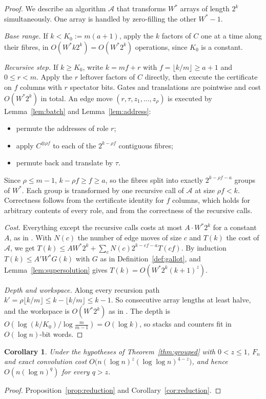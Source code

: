 \documentclass[11pt]{article}
\newtheorem{corollary}[theorem]{Corollary}
\theoremstyle{definition}
\theoremstyle{remark}
\begin{document}
\begin{proof}
We describe an algorithm $\mathcal A$ that transforms $W^*$ arrays of length $2^k$ simultaneously. One
array is handled by zero-filling the other $W^*-1$.

\emph{Base range.} If $k<K_0:=m(a+1)$, apply the $k$ factors of $C$ one at a time along their fibres,
in $O(W^*k2^k)=O(W^*2^k)$ operations, since $K_0$ is a constant.

\emph{Recursive step.} If $k\ge K_0$, write $k=mf+r$ with $f=\lfloor k/m\rfloor\ge a+1$ and
$0\le r<m$. Apply the $r$ leftover factors of $C$ directly, then execute the certificate on $f$ columns
with $r$ spectator bits. Gates and translations are pointwise and cost $O(W^*2^k)$ in total. An edge
move $(r,\tau,z_1,\dots,z_\rho)$ is executed by Lemma~\ref{lem:batch} and Lemma~\ref{lem:address}:
\begin{itemize}
\item permute the addresses of role $r$;
\item apply $C^{\otimes\rho f}$ to each of the $2^{k-\rho f}$ contiguous fibres;
\item permute back and translate by $\tau$.
\end{itemize}
Since $\rho\le m-1$, $k-\rho f\ge f\ge a$, so the fibres split into exactly $2^{k-\rho f-a}$ groups of
$W^*$. Each group is transformed by one recursive call of $\mathcal A$ at size $\rho f<k$. Correctness
follows from the certificate identity for $f$ columns, which holds for arbitrary contents of every
role, and from the correctness of the recursive calls.

\emph{Cost.} Everything except the recursive calls costs at most $A\cdot W^*2^k$ for a constant $A$,
as in \cite[Theorem~2.6]{oai}. With $N(c)$ the number of edge moves of size $c$ and $T(k)$ the cost of
$\mathcal A$, we get $T(k)\le AW^*2^k+\sum_cN(c)2^{k-cf-a}T(cf)$. By induction
$T(k)\le A'W^*G(k)$ with $G$ as in Definition~\ref{def:gallot}, and Lemma~\ref{lem:supersolution}
gives $T(k)=O(W^*2^k(k+1)^z)$.

\emph{Depth and workspace.} Along every recursion path
$k'=\rho\lfloor k/m\rfloor\le k-\lfloor k/m\rfloor\le k-1$. So consecutive array lengths at least halve,
and the workspace is $O(W^*2^k)$ as in \cite{oai}. The depth is
$O(\log(k/K_0)/\log\frac m{m-1})=O(\log k)$, so stacks and counters fit in $O(\log n)$-bit words.
\end{proof}

\begin{corollary}\label{cor:grouped}
Under the hypotheses of Theorem~\ref{thm:grouped} with $0<z\le1$, $F_n$ and exact convolution cost
$O\big(n(\log n)^z(\log\log n)^{4-z}\big)$, and hence $O(n(\log n)^{q})$ for every $q>z$.
\end{corollary}
\begin{proof}
Proposition~\ref{prop:reduction} and Corollary~\ref{cor:reduction}.
\end{proof}
\end{document}

